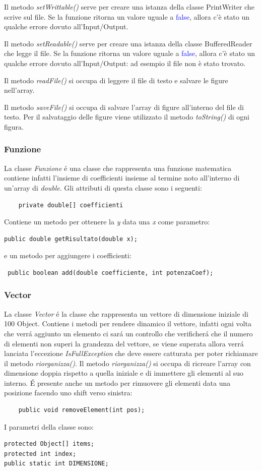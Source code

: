 \documentclass[a4paper,12pt]{article}
\begin{document}
Il metodo \textit{setWrittable()} serve per creare una istanza della classe PrintWriter che scrive sul file. Se la funzione ritorna un valore uguale a \textcolor{blue}{false}, allora c'è stato un qualche errore dovuto all'Input/Output.

Il metodo \textit{setReadable()} serve per creare una istanza della classe BufferedReader che legge il file. Se la funzione ritorna un valore uguale a \textcolor{blue}{false}, allora c'è stato un qualche errore dovuto all'Input/Output: ad esempio il file non è stato trovato.


Il metodo \textit{readFile()} si occupa di leggere il file di testo e salvare le figure nell'array.

Il metodo \textit{saveFile()} si occupa di salvare l'array di figure all'interno del file di testo. Per il salvataggio delle figure viene utilizzato il metodo \textit{toString()} di ogni figura.

\subsubsection{Funzione}
La classe \textit{Funzione} é una classe che rappresenta una funzione matematica contiene infatti l'insieme di coefficienti insieme al termine noto all'interno di un'array di \textit{double}.
Gli attributi di questa classe sono i seguenti:
\begin{lstlisting}
	private double[] coefficienti
\end{lstlisting}
Contiene un metodo per ottenere la \textit{y} data una \textit{x} come parametro:
\begin{lstlisting}
public double getRisultato(double x);
\end{lstlisting}
e un metodo per aggiungere i coefficienti:
\begin{lstlisting}
 public boolean add(double coefficiente, int potenzaCoef);
\end{lstlisting}

\subsubsection{Vector}
La classe \textit{Vector} é la classe che rappresenta un vettore di dimensione iniziale di 100 Object. Contiene i metodi per rendere dinamico il vettore, infatti ogni volta che verrá aggiunto un elemento ci sará un controllo che verificherá che il numero di elementi non superi la grandezza del vettore, se viene superata allora verrá lanciata l'eccezione \textit{IsFullException} che deve essere catturata per poter richiamare il metodo \textit{riorganizza()}. Il metodo \textit{riorganizza()} si occupa di ricreare l'array con dimensione doppia rispetto a quella iniziale e di immettere gli elementi al suo interno.
É presente anche un metodo per rimuovere gli elementi data una posizione facendo uno shift verso sinistra:
\begin{lstlisting}
	public void removeElement(int pos);
\end{lstlisting}
I parametri della classe sono:
\begin{lstlisting}
protected Object[] items;
protected int index;
public static int DIMENSIONE;
\end{lstlisting}
\end{document}
